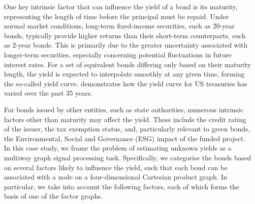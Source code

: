 One key intrinsic factor that can influence the yield of a bond is its maturity, representing the length of time before the principal must be repaid. Under normal market conditions, long-term fixed-income securities, such as 20-year bonds, typically provide higher returns than their short-term counterparts, such as 2-year bonds. This is primarily due to the greater uncertainty associated with longer-term securities, especially concerning potential fluctuations in future interest rates. For a set of equivalent bonds differing only based on their maturity length, the yield is expected to interpolate smoothly at any given time, forming the so-called yield curve.  demonstrates how the yield curve for US treasuries has varied over the past 35 years.

For bonds issued by other entities, such as state authorities, numerous intrinsic factors other than maturity may affect the yield. These include the credit rating of the issuer, the tax exemption status, and, particularly relevant to green bonds, the Environmental, Social and Governance (ESG) impact of the funded project. In this case study, we frame the problem of estimating unknown yields as a multiway graph signal processing task. Specifically, we categorise the bonds based on several factors likely to influence the yield, such that each bond can be associated with a node on a four-dimensional Cartesian product graph. In particular, we take into account the following factors, each of which forms the basis of one of the factor graphs. 

